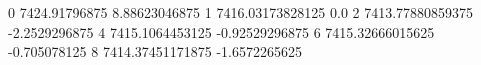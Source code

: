 0 7424.91796875 8.88623046875
1 7416.03173828125 0.0
2 7413.77880859375 -2.2529296875
4 7415.1064453125 -0.92529296875
6 7415.32666015625 -0.705078125
8 7414.37451171875 -1.6572265625
